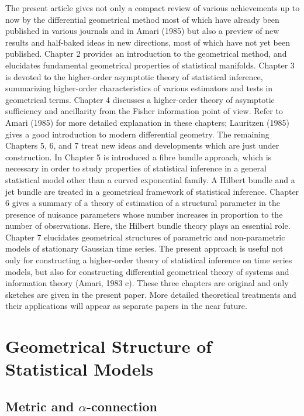 \documentclass[11pt]{article}
\begin{document}
            The present article gives not only a compact review of various
achievements up to now by the differential geometrical method most of which have
already been published in various journals and in Amari (1985) but also a pre{view}
     of new results and half-baked ideas in new directions, most of which have
not yet been published.  Chapter 2 provides an introduction to the geometrical
method, and elucidates fundamental geometrical properties of statistical mani{folds.}
        Chapter 3 is devoted to the higher-order asymptotic theory of statisti{cal}
    inference, summarizing higher-order characteristics of various estimators
and tests in geometrical terms.  Chapter 4 discusses a higher-order theory of
asymptotic sufficiency and ancillarity from the Fisher information point of
view.  Refer to Amari (1985) for more detailed explanation in these chapters;
Lauritzen (1985) gives a good introduction to modern differential geometry.  The
remaining Chapters 5, 6, and 7 treat new ideas and developments which are just
under construction.  In Chapter 5 is introduced a fibre bundle approach, which
is necessary in order to study properties of statistical inference in a general
statistical model other than a curved exponential family.  A Hilbert bundle and
a jet bundle are treated in a geometrical framework of statistical inference.
Chapter 6 gives a summary of a theory of estimation of a structural parameter
in the presence of nuisance parameters whose number increases in proportion to
the number of observations.  Here, the Hilbert bundle theory plays an essential
role.  Chapter 7 elucidates geometrical structures of parametric and non-para{metric}
       models of stationary Gaussian time series.  The present approach is use{ful}
    not only for constructing a higher-order theory of statistical inference on
time series models, but also for constructing differential geometrical theory of
systems and information theory (Amari, 1983 c).  These three chapters are
original and only sketches are given in the present paper.  More detailed theo{retical}
        treatments and their applications will appear as separate papers in the
near future.

\section{Geometrical Structure of Statistical Models}

\subsection{Metric and $\alpha$-connection}
\end{document}
